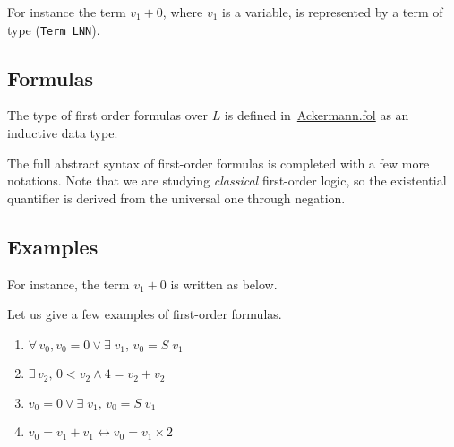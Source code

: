 




For instance the term $v_1+0$, where $v_1$ is a variable,
is represented by a term of type (\texttt{Term LNN}).


\subsection{Formulas}



The type of first order formulas over $L$ is defined 
in~\href{../theories/html/hydras.Ackermann.fol.html}{Ackermann.fol} as an inductive data type.


The full abstract syntax of first-order formulas is completed 
with a few more notations. Note that we are studying \emph{classical} first-order logic, so the existential quantifier is derived from the universal one through negation. 


\subsection{Examples}


For instance, the term $v_1+0$ is written as below.


Let us give a few examples of first-order formulas.

\label{fol:examplesf1f2f3}
\begin{enumerate}
\item $\forall\,v_0, v_0=0 \vee \exists\;v_1,\, v_0= S\;v_1$
\item $\exists\,v_2,\, 0< v_2 \wedge 4=v_2+v_2$
\item $ v_0=0 \vee \exists\;v_1,\, v_0= S\;v_1$
\item $v_0= v_1 + v_1 \leftrightarrow v_0 = v_1 \times 2$
\end{enumerate}


\begin{remark}
\end{remark}


